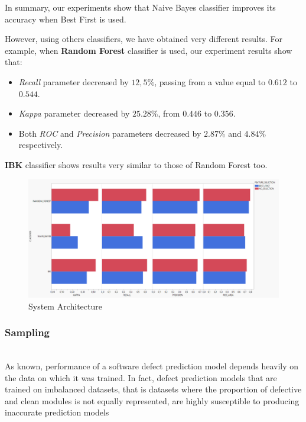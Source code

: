 \documentclass[sigconf]{acmart}
\begin{document}
In summary, our experiments show that Naive Bayes classifier improves its accuracy when Best First is used. 

However, using others classifiers, we have obtained very different results. For example, when \textbf{Random Forest} classifier is used, our experiment results show that: 

\begin{itemize}
\item \textit{Recall} parameter decreased by $12,5\%$, passing from a value equal to $0.612$ to $0.544$. 
\item \textit{Kappa} parameter decreased by $25.28\%$, from $0.446$ to $0.356$. 
\item Both \textit{ROC} and \textit{Precision} parameters decreased by $2.87\%$ and $4.84\%$ respectively.
\end{itemize}

\textbf{IBK} classifier shows results very similar to those of Random Forest too.

\begin{figure}[h]
  \centering
  \includegraphics[width=\linewidth]{1 - BOOKKEEPER - FeatureSelectionWithoutSampling.png}
  \caption{System Architecture}
  \label{fig:BOOKKEEPER:FeatureSelectionWithoutSampling}
\end{figure}

\subsubsection{Sampling}
\hfill\\

As known, performance of a software defect prediction model depends heavily on the data on which it was trained. In fact, defect prediction models that are trained on imbalanced datasets, that is datasets where the proportion of defective and clean modules is not equally represented, are highly susceptible to producing inaccurate prediction models \cite{FalessiSampling}
\end{document}
